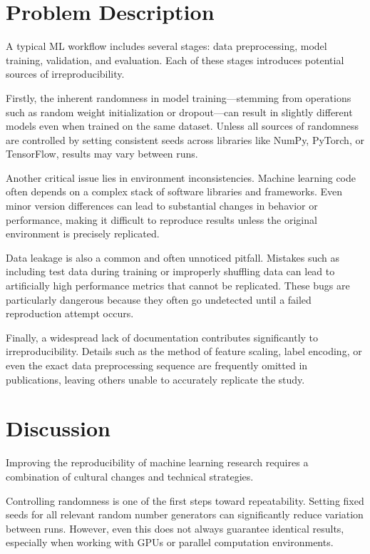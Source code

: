 \documentclass[11pt]{article}
\begin{document}
\section{Problem Description}
\label{sec:problem}
A typical ML workflow includes several stages: data preprocessing, model training, validation, and evaluation. Each of these stages introduces potential sources of irreproducibility.

Firstly, the inherent randomness in model training—stemming from operations such as random weight initialization or dropout—can result in slightly different models even when trained on the same dataset. Unless all sources of randomness are controlled by setting consistent seeds across libraries like NumPy, PyTorch, or TensorFlow, results may vary between runs.

Another critical issue lies in environment inconsistencies. Machine learning code often depends on a complex stack of software libraries and frameworks. Even minor version differences can lead to substantial changes in behavior or performance, making it difficult to reproduce results unless the original environment is precisely replicated.

Data leakage is also a common and often unnoticed pitfall. Mistakes such as including test data during training or improperly shuffling data can lead to artificially high performance metrics that cannot be replicated. These bugs are particularly dangerous because they often go undetected until a failed reproduction attempt occurs.

Finally, a widespread lack of documentation contributes significantly to irreproducibility. Details such as the method of feature scaling, label encoding, or even the exact data preprocessing sequence are frequently omitted in publications, leaving others unable to accurately replicate the study.


\section{Discussion}
\label{sec:system}
Improving the reproducibility of machine learning research requires a combination of cultural changes and technical strategies.

Controlling randomness is one of the first steps toward repeatability. Setting fixed seeds for all relevant random number generators can significantly reduce variation between runs. However, even this does not always guarantee identical results, especially when working with GPUs or parallel computation environments.
\end{document}
